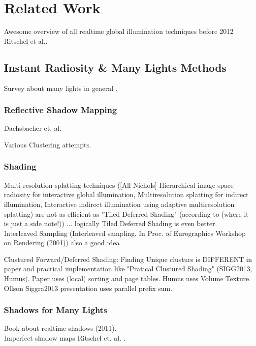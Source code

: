 \documentclass[thesis.tex]{subfiles}
\begin{document}
\chapter{Related Work}
\label{chap:prevwork}


Awesome overview of all realtime global illumination techniques before 2012 \cite{bib:RealtimeGIOverview} Ritschel et al..

\section {Instant Radiosity \& Many Lights Methods}
Survey about many lights in general \cite{bib:manylightssurvey2014}.


\subsection{Reflective Shadow Mapping}
Dachsbacher et. al. \cite{bib:reflectiveshadowmaps}

Various Clustering attempts.

\subsection{Shading}
Multi-resolution splatting techniques ([All Nichols] Hierarchical
image-space radiosity for interactive global illumination, Multiresolution splatting for indirect illumination, Interactive indirect illumination using adaptive multiresolution splatting) are not as efficient as "Tiled Deferred Shading" (according to \cite{bib:clusturedpreconvoledradiancecaching} (where it is just a side note!)) ... logically Tiled Deferred Shading is even better.
Interleaved Sampling (Interleaved sampling. In
Proc. of Eurographics Workshop on Rendering (2001)) also a good idea 

Clustured Forward/Deferred Shading: Finding Unique clusturs is DIFFERENT in paper \cite{bib:clusturedshading} and practical implementation like "Pratical Clustured Shading" (SIGG2013, Humus). Paper uses (local) sorting and page tables. Humus uses Volume Texture. Ollson Siggra2013 presentation uses parallel prefix sum.

\subsection{Shadows for Many Lights}
Book about realtime shadows (2011)\cite{bib:realtimeshadowsbook}.\\
Imperfect shadow maps Ritschel et. al. \cite{bib:imperfectshadowmaps}.\\
\end{document}
